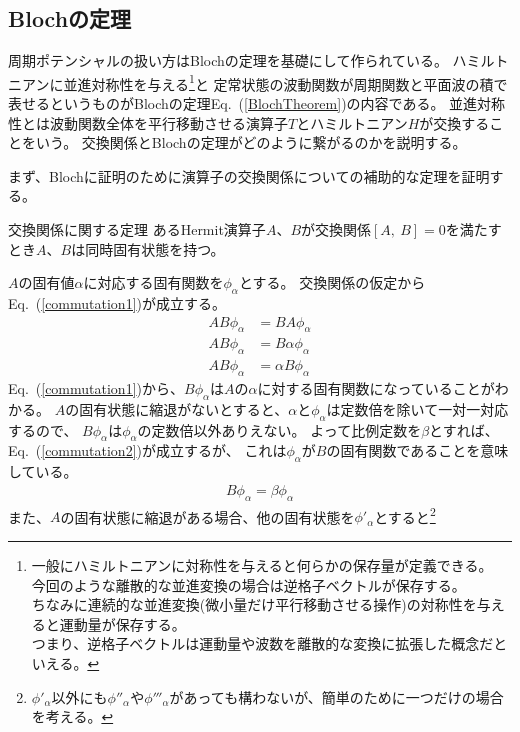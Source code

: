 \documentclass[autodetect-engine,dvipdfmx-if-dvi,ja=standard,a4paper,layout=v2]{bxjsreport}
\newcommand{\eref}[1]{Eq.~(\ref{#1})}
\begin{document}
    \subsection{Blochの定理}
    周期ポテンシャルの扱い方はBlochの定理を基礎にして作られている。
    ハミルトニアンに並進対称性を与える\footnote{
    一般にハミルトニアンに対称性を与えると何らかの保存量が定義できる。\\
    今回のような離散的な並進変換の場合は逆格子ベクトルが保存する。\\
    ちなみに連続的な並進変換(微小量だけ平行移動させる操作)の対称性を与えると運動量が保存する。\\
    つまり、逆格子ベクトルは運動量や波数を離散的な変換に拡張した概念だといえる。
    }と
    定常状態の波動関数が周期関数と平面波の積で表せるというものがBlochの定理\eref{BlochTheorem}の内容である。
    並進対称性とは波動関数全体を平行移動させる演算子$T$とハミルトニアン$H$が交換することをいう。
    交換関係とBlochの定理がどのように繋がるのかを説明する。\par
    まず、Blochに証明のために演算子の交換関係についての補助的な定理を証明する。
    \begin{itembox}[l]{交換関係に関する定理}
      あるHermit演算子$A$、$B$が交換関係$[A,\:B]=0$を満たすとき$A$、$B$は同時固有状態を持つ。
    \end{itembox}
    $A$の固有値$\alpha$に対応する固有関数を$\phi_\alpha$とする。
    交換関係の仮定から\eref{commutation1}が成立する。
    \begin{align}
      AB\phi_\alpha&=BA\phi_\alpha \nonumber\\
      AB\phi_\alpha&=B\alpha\phi_\alpha \nonumber\\
      AB\phi_\alpha&=\alpha B\phi_\alpha \label{commutation1}
    \end{align}
    \eref{commutation1}から、$B\phi_\alpha$は$A$の$\alpha$に対する固有関数になっていることがわかる。
    $A$の固有状態に縮退がないとすると、$\alpha$と$\phi_\alpha$は定数倍を除いて一対一対応するので、
    $B\phi_\alpha$は$\phi_\alpha$の定数倍以外ありえない。
    よって比例定数を$\beta$とすれば、\eref{commutation2}が成立するが、
    これは$\phi_\alpha$が$B$の固有関数であることを意味している。
    \begin{align}
      B\phi_\alpha=\beta\phi_\alpha\label{commutation2}
    \end{align}
    また、$A$の固有状態に縮退がある場合、他の固有状態を$\phi'_\alpha$とすると\footnote{
      $\phi'_\alpha$以外にも$\phi''_\alpha$や$\phi'''_\alpha$があっても構わないが、簡単のために一つだけの場合を考える。
    }
\end{document}
